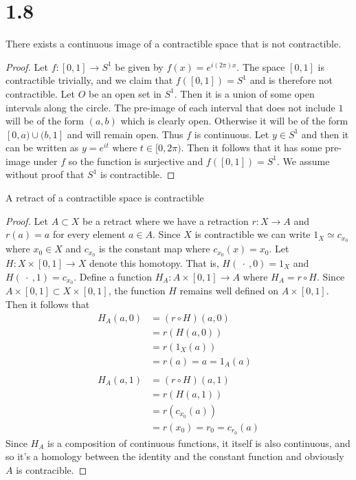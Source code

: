 \documentclass{article}
\theoremstyle{definition}
\begin{document}
\section*{1.8}
    \begin{mdframed}[]
        There exists a continuous image of a contractible space that is not contractible.
    \end{mdframed}
    \begin{proof}
        Let $f:[0,1] \rightarrow S^1$ be given by $f(x) = e^{i(2\pi)x}$. The space $[0,1]$ is contractible
        trivially, and we claim that $f([0,1]) = S^1$ and is therefore not contractible. Let $O$ be an open
        set in $S^1$. Then it is a union of some open intervals along the circle. The pre-image of each interval
        that does not include $1$ will be of the form $(a,b)$ which is clearly open. Otherwise it will be of the 
        form $[0,a) \cup (b,1]$ and will remain open. Thus $f$ is continuous. Let $y \in S^1$ and then it can be written 
        as $y = e^{i t}$ where $t \in [0,2\pi)$. Then it follows that it has some pre-image under $f$ so the 
        function is surjective and $f([0,1]) = S^1$. We assume without proof that $S^1$ is contractible.
    \end{proof}
    \begin{mdframed}[]
        A retract of a contractible space is contractible
    \end{mdframed}
    \begin{proof}
        Let $A \subset X$ be a retract where we have a retraction $r:X \rightarrow A$ and 
        $r(a) = a$ for every element $a \in A$. Since $X$ is contractible we can write $1_X \simeq c_{x_0}$
        where $x_0 \in X$ and $c_{x_0}$ is the constant map where $c_{x_0}(x) = x_0$. Let $H : X \times [0,1] \rightarrow X$
        denote this homotopy. That is, $H(\ \cdot \ , 0) = 1_X$ and $H(\ \cdot\ , 1) = c_{x_0}$. Define a function 
        $H_A:A \times [0,1] \rightarrow A$ where $H_A = r \circ H$. Since $A \times [0,1] \subset X \times [0,1]$,
        the function $H$ remains well defined on $A \times [0,1]$. Then it follows that
        \begin{align*}
            H_A(a, 0) &= (r \circ H)(a, 0) \\
            &= r(H(a, 0)) \\
            &= r(1_X(a)) \\
            &= r(a) = a = 1_A(a) \\\\
            H_A(a, 1) &= (r \circ H)(a, 1) \\
            &= r(H(a, 1)) \\
            &= r(c_{x_0}(a)) \\
            &= r(x_0) = r_0 = c_{r_0}(a)
        \end{align*}
        Since $H_A$ is a composition of continuous functions, it itself is also continuous, and so it's a
        homology between the identity and the constant function and obviously $A$ is contracible.
    \end{proof}
\end{document}
